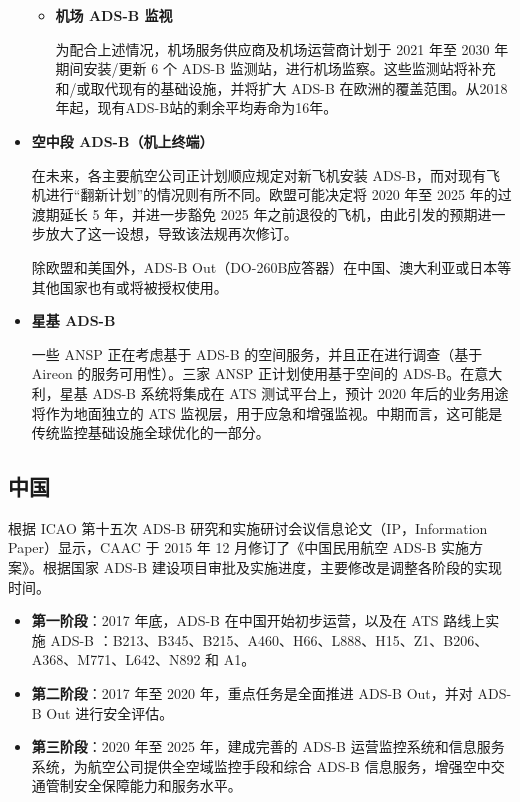 \begin{itemize}
\begin{itemize}
        \item \textbf{机场 ADS-B 监视}

        为配合上述情况，机场服务供应商及机场运营商计划于 2021 年至 2030 年期间安装/更新 6 个 ADS-B 监测站，进行机场监察。这些监测站将补充和/或取代现有的基础设施，并将扩大 ADS-B 在欧洲的覆盖范围。从2018年起，现有ADS-B站的剩余平均寿命为16年。
    \end{itemize}

    \item \textbf{空中段 ADS-B（机上终端）}

    在未来，各主要航空公司正计划顺应规定对新飞机安装 ADS-B，而对现有飞机进行“翻新计划”的情况则有所不同。欧盟可能决定将 2020 年至 2025 年的过渡期延长 5 年，并进一步豁免 2025 年之前退役的飞机，由此引发的预期进一步放大了这一设想，导致该法规再次修订。

    除欧盟和美国外，ADS-B Out（DO-260B应答器）在中国、澳大利亚或日本等其他国家也有或将被授权使用。

    \item \textbf{星基 ADS-B}

    一些 ANSP 正在考虑基于 ADS-B 的空间服务，并且正在进行调查（基于 Aireon 的服务可用性）。三家 ANSP 正计划使用基于空间的 ADS-B。在意大利，星基 ADS-B 系统将集成在 ATS 测试平台上，预计 2020 年后的业务用途将作为地面独立的 ATS 监视层，用于应急和增强监视。中期而言，这可能是传统监控基础设施全球优化的一部分。

\end{itemize}

\subsection{中国}

根据 ICAO 第十五次 ADS-B 研究和实施研讨会议信息论文（IP，Information Paper）显示，CAAC 于 2015 年 12 月修订了《中国民用航空 ADS-B 实施方案》。根据国家 ADS-B 建设项目审批及实施进度，主要修改是调整各阶段的实现时间。

\begin{itemize}
    \item \textbf{第一阶段}：2017 年底，ADS-B 在中国开始初步运营，以及在 ATS 路线上实施 ADS-B ：B213、B345、B215、A460、H66、L888、H15、Z1、B206、A368、M771、L642、N892 和 A1。

    \item \textbf{第二阶段}：2017 年至 2020 年，重点任务是全面推进 ADS-B Out，并对 ADS-B Out 进行安全评估。

    \item \textbf{第三阶段}：2020 年至 2025 年，建成完善的 ADS-B 运营监控系统和信息服务系统，为航空公司提供全空域监控手段和综合 ADS-B 信息服务，增强空中交通管制安全保障能力和服务水平。
\end{itemize}

